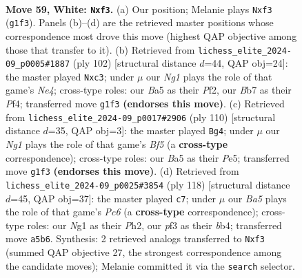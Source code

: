 \documentclass[11pt]{article}
\begin{document}
\clearpage

\begin{figure}[p]\centering
\begin{subfigure}{0.46\textwidth}\centering
\resizebox{\linewidth}{!}{%
\newchessgame
\chessboard[
  setfen={8/1B1k4/8/B5r1/PK4bp/1P3p2/5R2/6N1 w - - 12 59},
  showmover=false,
  pgfstyle=straightmove, color=movearrow, markmove={g1-f3}
]}
\caption{}
\end{subfigure}\hfill
\begin{subfigure}{0.46\textwidth}\centering
\resizebox{\linewidth}{!}{%
\newchessgame
\chessboard[
  setfen={8/6b1/6k1/p7/4NPp1/1Pp5/r4P2/2R2K2 w - - 0 52},
  showmover=false,
  pgfstyle=straightmove, color=movearrow, markmove={e4-c3}
]}
\caption{}
\end{subfigure}
\\[4pt]
\begin{subfigure}{0.46\textwidth}\centering
\resizebox{\linewidth}{!}{%
\newchessgame
\chessboard[
  setfen={8/1b3k2/3R4/3pPB2/1r5K/3p3P/8/8 w - - 2 56},
  showmover=false,
  pgfstyle=straightmove, color=movearrow, markmove={f5-g4}
]}
\caption{}
\end{subfigure}\hfill
\begin{subfigure}{0.46\textwidth}\centering
\resizebox{\linewidth}{!}{%
\newchessgame
\chessboard[
  setfen={8/p3k3/2P5/5B2/1br3p1/6P1/7P/1R5K w - - 2 60},
  showmover=false,
  pgfstyle=straightmove, color=movearrow, markmove={c6-c7}
]}
\caption{}
\end{subfigure}
\caption{\textbf{Move 59, White: \texttt{Nxf3}.} (a) Our position; Melanie plays \texttt{Nxf3} (\texttt{g1f3}). Panels (b)--(d) are the retrieved master positions whose correspondence most drove this move (highest QAP objective among those that transfer to it). (b) Retrieved from \texttt{lichess\_elite\_2024-09\_p0005\#1887} (ply 102) [structural distance $d$=44, QAP obj=24]: the master played \texttt{Nxc3}; under $\mu$ our \emph{Ng1} plays the role of that game's \emph{Ne4}; cross-type roles: our \emph{B}a5 as their \emph{P}f2, our \emph{B}b7 as their \emph{P}f4; transferred move \texttt{g1f3} \textbf{(endorses this move)}. (c) Retrieved from \texttt{lichess\_elite\_2024-09\_p0017\#2906} (ply 110) [structural distance $d$=35, QAP obj=3]: the master played \texttt{Bg4}; under $\mu$ our \emph{Ng1} plays the role of that game's \emph{Bf5} (a \textbf{cross-type} correspondence); cross-type roles: our \emph{B}a5 as their \emph{P}e5; transferred move \texttt{g1f3} \textbf{(endorses this move)}. (d) Retrieved from \texttt{lichess\_elite\_2024-09\_p0025\#3854} (ply 118) [structural distance $d$=45, QAP obj=37]: the master played \texttt{c7}; under $\mu$ our \emph{Ba5} plays the role of that game's \emph{Pc6} (a \textbf{cross-type} correspondence); cross-type roles: our \emph{N}g1 as their \emph{P}h2, our \emph{p}f3 as their \emph{b}b4; transferred move \texttt{a5b6}. Synthesis: 2 retrieved analogs transferred to \texttt{Nxf3} (summed QAP objective 27, the strongest correspondence among the candidate moves); Melanie committed it via the \texttt{search} selector.}
\label{fig:thought-m116}
\end{figure}
\end{document}
